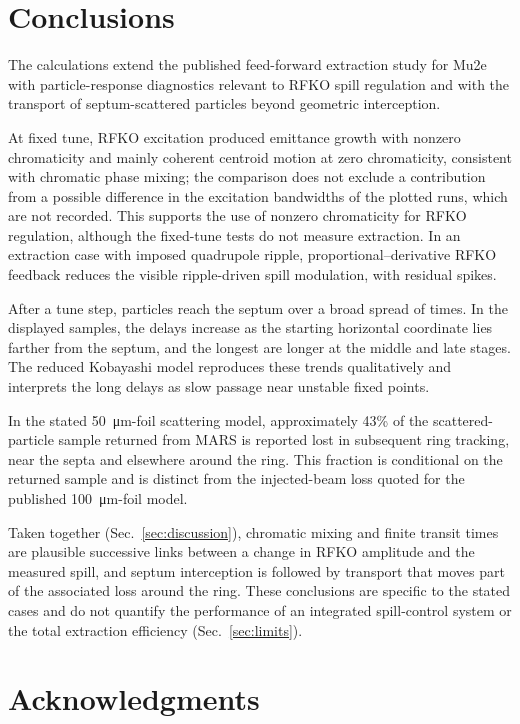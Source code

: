 \documentclass[a4paper,fleqn]{cas-sc}
\begin{document}
\section{\label{sec:conclusion}Conclusions}

The calculations extend the published feed-forward extraction study for Mu2e~\cite{mu2e} with particle-response diagnostics relevant to RFKO spill regulation and with the transport of septum-scattered particles beyond geometric interception.

At fixed tune, RFKO excitation produced emittance growth with nonzero chromaticity and mainly coherent centroid motion at zero chromaticity, consistent with chromatic phase mixing; the comparison does not exclude a contribution from a possible difference in the excitation bandwidths of the plotted runs, which are not recorded. This supports the use of nonzero chromaticity for RFKO regulation, although the fixed-tune tests do not measure extraction. In an extraction case with imposed quadrupole ripple, proportional--derivative RFKO feedback reduces the visible ripple-driven spill modulation, with residual spikes.

After a tune step, particles reach the septum over a broad spread of times. In the displayed samples, the delays increase as the starting horizontal coordinate lies farther from the septum, and the longest are longer at the middle and late stages. The reduced Kobayashi model reproduces these trends qualitatively and interprets the long delays as slow passage near unstable fixed points.

In the stated \SI{50}{\micro\metre}-foil scattering model, approximately 43\% of the scattered-particle sample returned from MARS is reported lost in subsequent ring tracking, near the septa and elsewhere around the ring. This fraction is conditional on the returned sample and is distinct from the injected-beam loss quoted for the published \SI{100}{\micro\metre}-foil model.

Taken together (Sec.~\ref{sec:discussion}), chromatic mixing and finite transit times are plausible successive links between a change in RFKO amplitude and the measured spill, and septum interception is followed by transport that moves part of the associated loss around the ring. These conclusions are specific to the stated cases and do not quantify the performance of an integrated spill-control system or the total extraction efficiency (Sec.~\ref{sec:limits}).


\section{\label{thanks}Acknowledgments}
\end{document}
